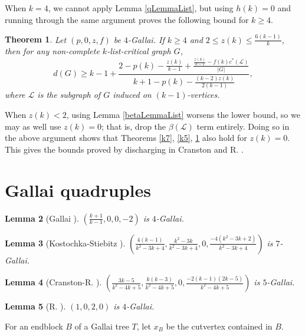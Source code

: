 \documentclass[10pt]{article}
\theoremstyle{plain}
\newtheorem{thm}{Theorem}[section]
\newtheorem{lem}[thm]{Lemma}
\theoremstyle{definition}
\theoremstyle{remark}
\newcommand{\fancy}[1]{\mathcal{#1}}
\renewcommand{\L}{\fancy{L}}
\newcommand{\card}[1]{\left|#1\right|}
\newcommand{\parens}[1]{\left( #1 \right)}
\begin{document}
\noindent When $k=4$, we cannot apply Lemma \ref{qLemmaList}, but using $h(k)=0$ and running through the same argument proves the following bound for $k\ge 4$.
\begin{thm}\label{k4}
	Let $\parens{p,0,z,f}$ be $4$-Gallai.  If $k \ge 4$ and $2 \le z(k) \le \frac{6(k-1)}{k}$, then for any non-complete $k$-list-critical graph $G$,
	\[d(G) \ge k-1 + \frac{2 - p(k) - \frac{z(k)}{k-1} + \frac{\frac{z(k)}{k-1} - f(k)c^*(\L)}{\card{G}}}{k+1 - p(k) - \frac{(k-2)z(k)}{2(k-1)}},\]
	where $\L$ is the subgraph of $G$ induced on $(k-1)$-vertices.
\end{thm}

When $z(k) < 2$, using Lemma \ref{betaLemmaList} worsens the lower bound, so we may as well use $z(k)=0$; that is, drop the $\beta(\L)$ term entirely.  
Doing so in the above argument shows that Theorems \ref{k7}, \ref{k5}, \ref{k4} also hold for $z(k) = 0$.  This gives the bounds proved by discharging in Cranston and R. \cite{DischargingLowerBound}.

\section{Gallai quadruples}

\begin{lem}[Gallai \cite{gallai1963kritische}]
$\parens{\frac{k+1}{k-1}, 0, 0, -2}$ is $4$-Gallai.
\end{lem}

\begin{lem}[Kostochka-Stiebitz \cite{kostochkastiebitzedgesincriticalgraph}]
$\parens{\frac{4(k-1)}{k^2 - 3k + 4}, \frac{k^2 - 3k}{k^2-3k+4}, 0, \frac{-4(k^2-3k+2)}{k^2-3k+4}}$ is $7$-Gallai.
\end{lem}

\begin{lem}[Cranston-R. \cite{DischargingLowerBound}]
$\parens{\frac{3k-5}{k^2-4k+5}, \frac{k(k-3)}{k^2-4k+5}, 0, \frac{-2(k-1)(2k-5)}{k^2-4k+5}}$ is $5$-Gallai.
\end{lem}

\begin{lem}[R. \cite{Better4ListCriticalBound}]
$\parens{1, 0, 2, 0}$ is $4$-Gallai.
\end{lem}

For an endblock $B$ of a Gallai tree $T$, let $x_B$ be the cutvertex contained in $B$.
\end{document}
